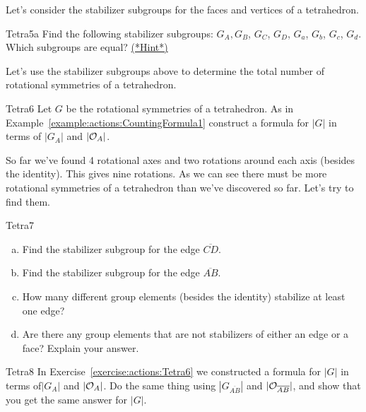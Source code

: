 Let's consider the stabilizer subgroups for the faces and vertices of a tetrahedron. 

\begin{exercise}{Tetra5a}
Find the following stabilizer subgroups:
$G_{A},  G_{B}$, $G_{C}$, $G_{D}$, $G_{a}$, $G_{b}$, $G_{c}$, $G_{d}$. Which subgroups are equal?
\hyperref[sec:actions:hints]{(*Hint*)}
\end{exercise}

Let's use the stabilizer subgroups above to determine the total number of rotational symmetries of a tetrahedron.  

\begin{exercise}{Tetra6} 
Let $G$ be the rotational symmetries of a tetrahedron.  As in Example~\ref{example:actions:CountingFormula1} construct a formula for $|G|$ in terms of $| G_{A}|$ and $|{\cal O}_{A}|$.  \end {exercise}
So far we've found 4 rotational axes and two rotations around each axis (besides the identity). This gives nine rotations.  As we can see there must be more rotational symmetries of a tetrahedron than we've discovered so far.  Let's try to find them. 

\begin{exercise}{Tetra7}
\begin{enumerate}[(a)]
\item Find the stabilizer subgroup for the edge $\overline{CD}$. 
\item Find the stabilizer subgroup for the edge $\overline{AB}$.
\item How many different group elements (besides the identity) stabilize at least one edge?
\item Are there any group elements that are not stabilizers of either an edge or a face?  Explain your answer.
\end{enumerate}
\end{exercise}	

\begin{exercise}{Tetra8}
In Exercise~\ref{exercise:actions:Tetra6} we constructed a formula for $|G|$ in terms of$| G_{A}|$ and $|{\cal O}_{A}|$. Do the same thing using $| G_{\overline{AB}}|$ and $|{\cal O}_{\overline{AB}}|$, and show that you get the same answer for $|G|$.
\end{exercise}

